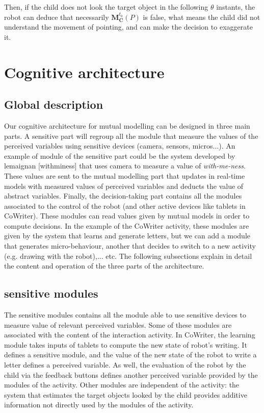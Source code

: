 \documentclass[10pt,a4paper,twocolumn]{article}
\begin{document}
Then, if the child does not look the target object in the following $\theta$ instants, the robot can deduce that necessarily  $\textbf{M}^{t_0}_\textbf{C}(P)$ is false, what means the child did not understand the movement of pointing, and can make the decision to exaggerate it. 


\section{Cognitive architecture}

\subsection{Global description}

Our cognitive architecture for mutual modelling can be designed in three main parts. A sensitive part will regroup all the module that measure the values of the perceived variables using sensitive devices (camera, sensors, micros...). An example of module of the sensitive part could be the system developed by lemaignan [withminess] that uses camera to measure a value of \textit{with-me-ness}. These values are sent to the mutual modelling part that updates in real-time models with measured values of perceived variables and deducts the value of abstract variables. Finally, the decision-taking part contains all the modules associated to the control of the robot (and other active devices like tablets in CoWriter). These modules can read values given by mutual models in order to compute decisions. In the example of the CoWriter activity, these modules are given by the system that learns and generate letters, but we can add a module that generates micro-behaviour, another that decides to switch to a new activity (e.g. drawing with the robot),... etc. The following subsections explain in detail the content and operation of the three parts of the architecture. 

\subsection{sensitive modules}

The sensitive modules contains all the module able to use sensitive devices to measure value of relevant perceived variables. Some of these modules are associated with the content of the interaction activity. In CoWriter, the learning module takes inputs of tablets to compute the new state of robot's writing. It defines a sensitive module, and the value of the new state of the robot to write a letter defines a perceived variable. As well, the evaluation of the robot by the child via the feedback buttons defines another perceived variable provided by the modules of the activity. Other modules are independent of the activity: the system that estimates the target objects looked by the child provides additive information not directly used by the modules of the activity.  
\end{document}
